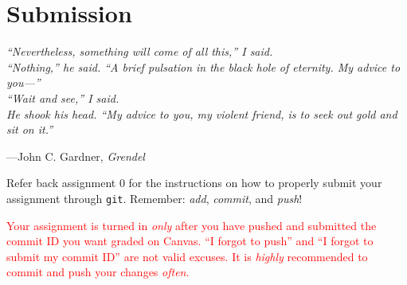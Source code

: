 \section{Submission}
\textwidth
\epigraph{\emph{%
``Nevertheless, something will come of all this,'' I said. \\
``Nothing,'' he said. ``A brief pulsation in the black hole of eternity. My advice to you---'' \\
``Wait and see,'' I said. \\
He shook his head. ``My advice to you, my violent friend, is to seek out gold and sit on it.''}}
{---John C.\xspace Gardner, \emph{Grendel}}

Refer back assignment 0 for the instructions on how to properly submit
your assignment through \texttt{git}. Remember: \emph{add},
\emph{commit}, and \emph{push}!

\textcolor{red}{Your assignment is turned in \emph{only} after you have
pushed and submitted the commit ID you want graded on Canvas. ``I
forgot to push'' and ``I forgot to submit my commit ID'' are not valid
excuses. It is \emph{highly} recommended to commit and push your changes
\emph{often}.}
